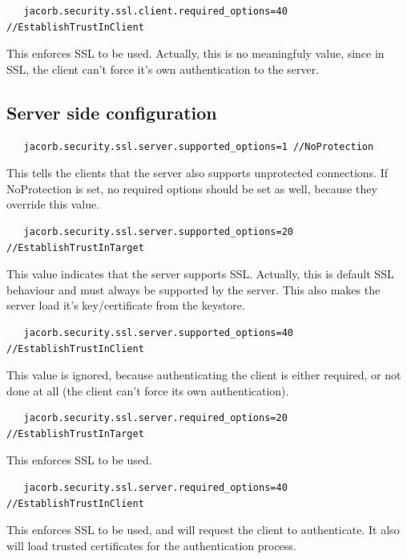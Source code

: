 \begin{verbatim}
   jacorb.security.ssl.client.required_options=40 //EstablishTrustInClient
\end{verbatim}
This enforces SSL to be used. Actually, this is no meaningfuly value, since in
SSL, the client can't force it's own authentication to the server.


\subsection{Server side configuration}

\begin{verbatim}
   jacorb.security.ssl.server.supported_options=1 //NoProtection
\end{verbatim}
This tells the clients that the server also supports unprotected
connections. If NoProtection is set, no required options should be set as
well, because they override this value.

\begin{verbatim}
   jacorb.security.ssl.server.supported_options=20 //EstablishTrustInTarget
\end{verbatim}
This value indicates that the server supports SSL. Actually, this is default
SSL behaviour and must always be supported by the server. This also makes the
server load it's key/certificate from the keystore.

\begin{verbatim}
   jacorb.security.ssl.server.supported_options=40 //EstablishTrustInClient
\end{verbatim}
This value is ignored, because authenticating the client is either
required, or not done at all (the client can't force its own
authentication).

\begin{verbatim}
   jacorb.security.ssl.server.required_options=20 //EstablishTrustInTarget
\end{verbatim}
This enforces SSL to be used.

\begin{verbatim}
   jacorb.security.ssl.server.required_options=40 //EstablishTrustInClient
\end{verbatim}
This enforces SSL to be used, and will request the client to authenticate. It
also will load trusted certificates for the authentication process.



